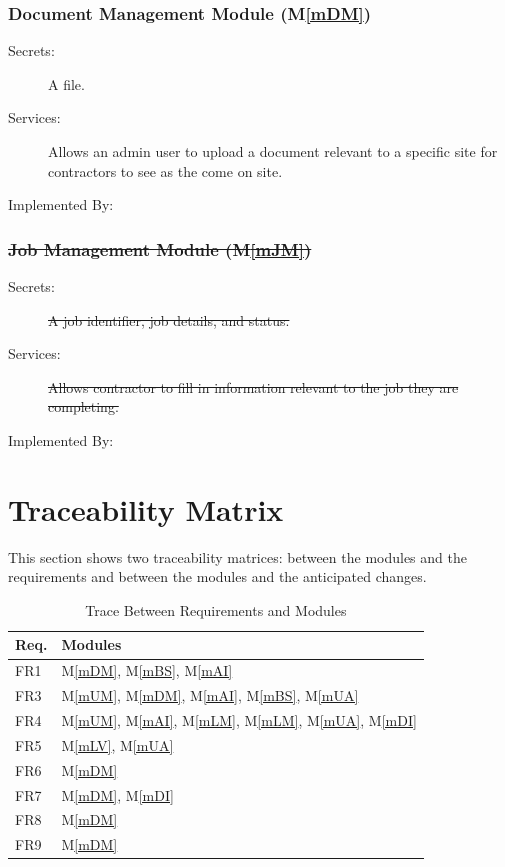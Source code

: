 \documentclass[12pt, titlepage]{article}
\newcommand{\mref}[1]{M\ref{#1}}
\begin{document}
\subsubsection{Document Management Module (\mref{mDM})}
\begin{description}
  \item[Secrets:] A file.
  \item[Services:] Allows an admin user to upload a document relevant
    to a specific site for contractors to see as the come on site.
  \item[Implemented By:] \progname
\end{description}

\subsubsection{\sout{Job Management Module (\mref{mJM})}}
\begin{description}
  \item[Secrets:] \sout{A job identifier, job details, and status.}
  \item[Services:] \sout{Allows contractor to fill in information relevant
    to the job they are completing.}
  \item[Implemented By:] \sout{\progname}
\end{description}

\section{Traceability Matrix} \label{SecTM}

This section shows two traceability matrices: between the modules and the
requirements and between the modules and the anticipated changes.

\begin{table}[H]
  \centering
  \begin{tabular}{p{} p{}}
    \toprule
    \textbf{Req.} & \textbf{Modules}
    \\
    \midrule
    FR1            & \mref{mDM}, \mref{mBS}, \mref{mAI}
    \\
    FR3            & \mref{mUM}, \mref{mDM}, \mref{mAI}, \mref{mBS}, \mref{mUA}
    \\
    FR4            & \mref{mUM}, \mref{mAI}, \mref{mLM}, \mref{mLM},
    \mref{mUA}, \mref{mDI}
    \\
    FR5            & \mref{mLV}, \mref{mUA}
    \\
    FR6            & \mref{mDM}
    \\
    FR7            & \mref{mDM}, \mref{mDI}
    \\
    FR8            & \mref{mDM}
    \\
    FR9            & \mref{mDM}
    \\
    \bottomrule
  \end{tabular}
  \caption{Trace Between Requirements and Modules}
  \label{TblRT}
\end{table}
\end{document}
